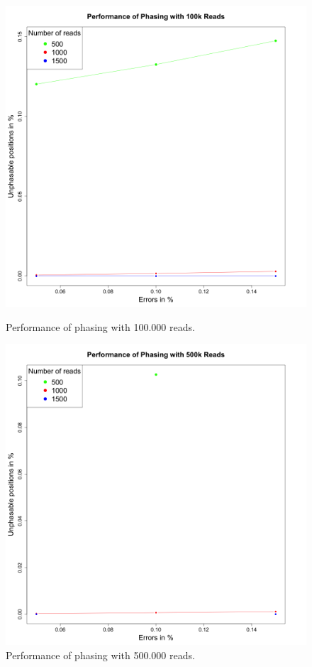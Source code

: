 \documentclass[10pt,a4paper]{article}
\begin{document}
\newpage
\begin{figure}[!ht]
\centering
\label{fig:unphasable100k}
\includegraphics[height=0.5\textheight]{../output/plots/unphasable100k}
\caption{\footnotesize Performance of phasing with 100.000 reads.}
\label{fig:unphasable500k}
\includegraphics[height=0.5\textheight]{../output/plots/unphasable500k}
\caption{\footnotesize Performance of phasing with 500.000 reads.}
\end{figure}
\end{document}
